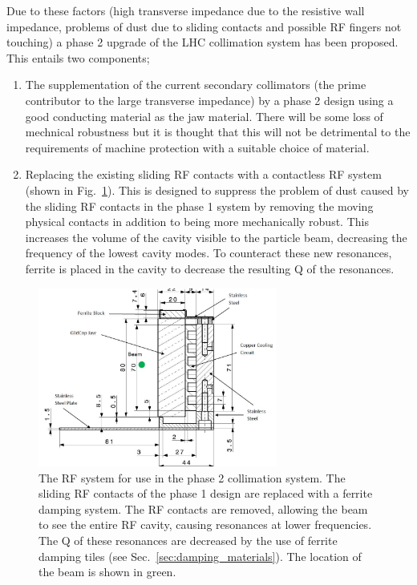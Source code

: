 Due to these factors (high transverse impedance due to the resistive wall impedance, problems of dust due to sliding contacts and possible RF fingers not touching) a phase 2 upgrade of the LHC collimation system has been proposed. This entails two components;

\begin{enumerate}
\item{The supplementation of the current secondary collimators (the prime contributor to the large transverse impedance) by a phase 2 design using a good conducting material as the jaw material. There will be some loss of mechnical robustness but it is thought that this will not be detrimental to the requirements of machine protection with a suitable choice of material.}
\item{Replacing the existing sliding RF contacts with a contactless RF system (shown in Fig.~\ref{fig:phase-2-rf-system}). This is designed to suppress the problem of dust caused by the sliding RF contacts in the phase 1 system by removing the moving physical contacts in addition to being more mechanically robust. This increases the volume of the cavity visible to the particle beam, decreasing the frequency of the lowest cavity modes. To counteract these new resonances, ferrite is placed in the cavity to decrease the resulting Q of the resonances.}
\end{enumerate}

\begin{figure}
\begin{center}
\includegraphics[width=0.7\textwidth]{LHC_Collimation_Upgrades/figures/cu-geo.jpg}
\end{center}
\caption{The RF system for use in the phase 2 collimation system. The sliding RF contacts of the phase 1 design are replaced with a ferrite damping system. The RF contacts are removed, allowing the beam to see the entire RF cavity, causing resonances at lower frequencies. The Q of these resonances are decreased by the use of ferrite damping tiles (see Sec.~\ref{sec:damping_materials}). The location of the beam is shown in green.}
\label{fig:phase-2-rf-system}
\end{figure}

